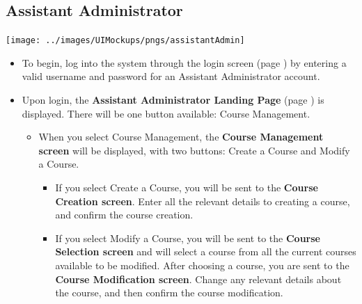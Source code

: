 \documentclass{article}
\begin{document}
\subsection{Assistant Administrator}
\centerline{\texttt{[image: ../images/UIMockups/pngs/assistantAdmin]}}
\begin{itemize}
  \item To begin, log into the system through the login screen (page \pageref{login})
    by entering a valid username and password for an Assistant Administrator 
    account.
  \item Upon login, the \textbf{Assistant Administrator Landing Page} (page
    \pageref{landPg}) is displayed. There will be one button available: Course
    Management.
    \begin{itemize}
    \item When you select Course Management, the \textbf{Course Management
      screen} will be displayed, with two buttons: Create a Course and Modify a 
      Course.
      \begin{itemize}
      \item If you select Create a Course, you will be sent to the \textbf{Course
	Creation screen}. Enter all the relevant details to creating a course, and
	confirm the course creation.
      \item If you select Modify a Course, you will be sent to the \textbf{Course
	Selection screen} and will select a course from all the current courses
	available to be modified. After choosing a course, you are sent to the
	\textbf{Course Modification screen}. Change any relevant details about
	the course, and then confirm the course modification.
      \end{itemize}
    \end{itemize}
\end{itemize}
\end{document}
